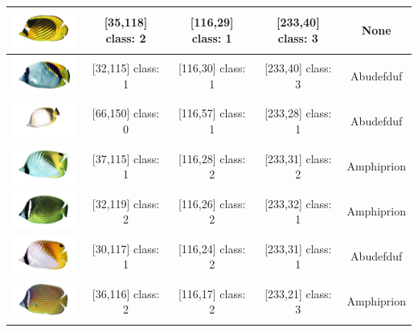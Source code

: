 \begin{longtable}{|c|c|c|c|c|}
	\includegraphics[width=3cm]{gambar/dataset_validasi/Chaetodon02} & [35,118] class: 2 & [116,29] class: 1 & [233,40] class: 3 & None \\ \hline
	\includegraphics[width=3cm]{gambar/dataset_validasi/Chaetodon03} & [32,115] class: 1 & [116,30] class: 1 & [233,40] class: 3 & Abudefduf \\ \hline
	\includegraphics[width=3cm]{gambar/dataset_validasi/Chaetodon04} & [66,150] class: 0 & [116,57] class: 1 & [233,28] class: 1 & Abudefduf \\ \hline
	\includegraphics[width=3cm]{gambar/dataset_validasi/Chaetodon05} & [37,115] class: 1 & [116,28] class: 2 & [233,31] class: 2 & Amphiprion \\ \hline
	\includegraphics[width=3cm]{gambar/dataset_validasi/Chaetodon06} & [32,119] class: 2 & [116,26] class: 2 & [233,32] class: 1 & Amphiprion \\ \hline
	\includegraphics[width=3cm]{gambar/dataset_validasi/Chaetodon07} & [30,117] class: 1 & [116,24] class: 2 & [233,31] class: 1 & Abudefduf \\ \hline
	\includegraphics[width=3cm]{gambar/dataset_validasi/Chaetodon08} & [36,116] class: 2 & [116,17] class: 2 & [233,21] class: 3 & Amphiprion \\ \hline

\end{longtable}
